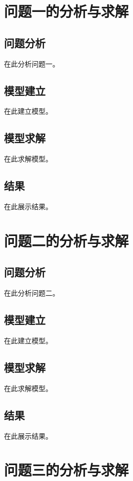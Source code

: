 \documentclass[withoutpreface]{cumcmthesis}
\begin{document}
\section{问题一的分析与求解}
\subsection{问题分析}
在此分析问题一。

\subsection{模型建立}
在此建立模型。

\subsection{模型求解}
在此求解模型。

\subsection{结果}
在此展示结果。

\section{问题二的分析与求解}
\subsection{问题分析}
在此分析问题二。

\subsection{模型建立}
在此建立模型。

\subsection{模型求解}
在此求解模型。

\subsection{结果}
在此展示结果。

\section{问题三的分析与求解}
\end{document}

